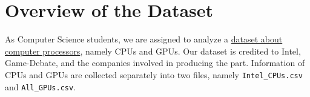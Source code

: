 \chapter{Overview of the Dataset}

As Computer Science students, we are assigned to analyze a \href{https://www.kaggle.com/datasets/iliassekkaf/computerparts/data}{dataset about computer processors}, namely CPUs and GPUs. Our dataset is credited to Intel, Game-Debate, and the companies involved in producing the part. Information of CPUs and GPUs are collected separately into two files, namely \texttt{Intel\_CPUs.csv} and \texttt{All\_GPUs.csv}.

